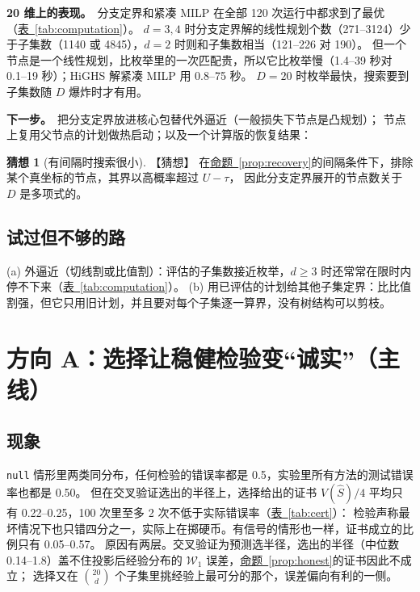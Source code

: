 \documentclass[11pt,a4paper,fontset=none]{ctexart}
\newcommand{\Tabref}[1]{\hyperref[#1]{表~\ref*{#1}}}
\newcommand{\Nref}[2]{\hyperref[#2]{#1~\ref*{#2}}}
\theoremstyle{definition}
\newtheorem{conjecture}[proposition]{猜想}
\newcommand{\para}[1]{\par\smallskip\noindent\textbf{#1}\ }
\newcommand{\status}[1]{\textrm{【#1】}}
\begin{document}
\para{20 维上的表现。}分支定界和紧凑 MILP 在全部 120 次运行中都求到了最优（\Tabref{tab:computation}）。
$d=3,4$ 时分支定界解的线性规划个数（271--3124）少于子集数（1140 或 4845），$d=2$ 时则和子集数相当（121--226 对 190）。
但一个节点是一个线性规划，比枚举里的一次匹配贵，所以它比枚举慢（1.4--39 秒对 0.1--19 秒）；HiGHS 解紧凑 MILP 用 0.8--75 秒。
$D=20$ 时枚举最快，搜索要到子集数随 $D$ 爆炸时才有用。

\para{下一步。}把分支定界放进核心包替代外逼近（一般损失下节点是凸规划）；
节点上复用父节点的计划做热启动；以及一个计算版的恢复结果：

\begin{conjecture}[有间隔时搜索很小]\label{conj:search}\status{猜想}
在\Nref{命题}{prop:recovery}的间隔条件下，排除某个真坐标的节点，其界以高概率超过 $U-\tau$，
因此分支定界展开的节点数关于 $D$ 是多项式的。
\end{conjecture}

\subsection{试过但不够的路}
(a) 外逼近（切线割或比值割）：评估的子集数接近枚举，$d\ge3$ 时还常常在限时内停不下来（\Tabref{tab:computation}）。
(b) 用已评估的计划给其他子集定界：比比值割强，但它只用旧计划，并且要对每个子集逐一算界，没有树结构可以剪枝。

\section{方向 A：选择让稳健检验变“诚实”（主线）}\label{sec:honest}
\subsection{现象}
\texttt{null} 情形里两类同分布，任何检验的错误率都是 0.5，实验里所有方法的测试错误率也都是 0.50。
但在交叉验证选出的半径上，选择给出的证书 $V(\widehat S)/4$ 平均只有 0.22--0.25，100 次里至多 2 次不低于实际错误率（\Tabref{tab:cert}）：
检验声称最坏情况下也只错四分之一，实际上在掷硬币。有信号的情形也一样，证书成立的比例只有 0.05--0.57。
原因有两层。交叉验证为预测选半径，选出的半径（中位数 0.14--1.8）盖不住投影后经验分布的 $\mathcal W_1$ 误差，\Nref{命题}{prop:honest}的证书因此不成立；
选择又在 $\binom{20}{d}$ 个子集里挑经验上最可分的那个，误差偏向有利的一侧。
\end{document}
